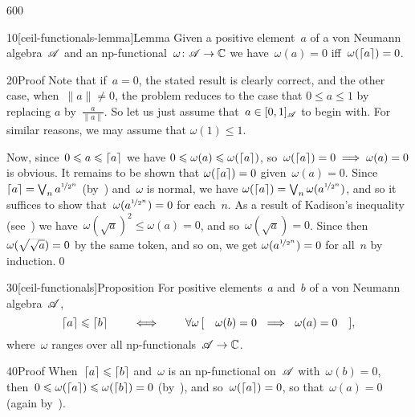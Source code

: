 \begin{parsec}{600}%
\begin{point}{10}[ceil-functionals-lemma]{Lemma}%
Given a positive element~$a$
of a von Neumann algebra~$\mathscr{A}$ and an
np-functional~$\omega\colon \mathscr{A}\to\mathbb{C}$
we have~$\omega(a)=0$ iff~$\omega(\left\lceil a\right\rceil)=0$.
\begin{point}{20}{Proof}%
Note that if~$a=0$,
the stated result is clearly correct,
and the other case, when~$\|a\| \neq 0$,
the problem reduces to the case
that $0\leq a\leq 1$
by replacing $a$ by~$\frac{a}{\|a\|}$.
So let us just assume that~$a\in [0,1]_{\mathscr{A}}$
to begin with.
For similar reasons, we may assume that $\omega (1)\leq 1$.

Now, since~$0\leqslant a\leqslant \left\lceil a\right\rceil$
we have $0\leqslant \omega(a)\leqslant \omega(\left\lceil a\right\rceil)$,
so~$\omega(\left\lceil a\right\rceil)=0\implies \omega(a)=0$
is obvious.
It remains to be shown that $\omega(\left\lceil a\right\rceil)=0$
given~$\omega(a)=0$.
Since  $\left\lceil a\right\rceil=\bigvee_n a^{\nicefrac{1}{2^n}}$ 
(by~)
and~$\omega$ is normal,
we have $\omega(\left\lceil a\right\rceil)=\bigvee_n \omega(a^{\nicefrac{1}{2^n}})$,
and so it suffices to show that~$\omega(a^{\nicefrac{1}{2^n}})=0$
for each~$n$.
As a result of Kadison's inequality
(see~)
we have~$\omega(\sqrt{a})^2\leq \omega(a)=0$,
and so~$\omega(\sqrt{a})=0$.
Since then~$\omega(\smash{\sqrt{\sqrt{a}}})=0$
by the same token, and so on,
we get $\omega(a^{\nicefrac{1}{2^n}})=0$
for all~$n$ by induction.\qed
\end{point}
\end{point}
\begin{point}{30}[ceil-functionals]{Proposition}%
For positive elements~$a$ and~$b$ of a von Neumann algebra~$\mathscr{A}$,
\begin{equation*}
\left\lceil a\right\rceil\leqslant \left\lceil b\right\rceil
\qquad\iff\qquad
\forall \omega\,[\quad\omega(b)=0\  \implies  \ \omega(a)=0\quad ],
\end{equation*}
where~$\omega$ ranges over all np-functionals~$\mathscr{A}\to\mathbb{C}$.
\begin{point}{40}{Proof}%
When~$\left\lceil a\right\rceil\leqslant\left\lceil b\right\rceil$
and~$\omega$ is an np-functional on~$\mathscr{A}$
with~$\omega(b)=0$,
then~$0\leqslant \omega(\left\lceil a\right\rceil)\leqslant \omega(\left\lceil b\right\rceil)=0$
(by~),
and so~$\omega(\left\lceil a\right\rceil)=0$,
so that~$\omega(a)=0$
(again
by~).


\end{point}
\end{point}
\end{parsec}
